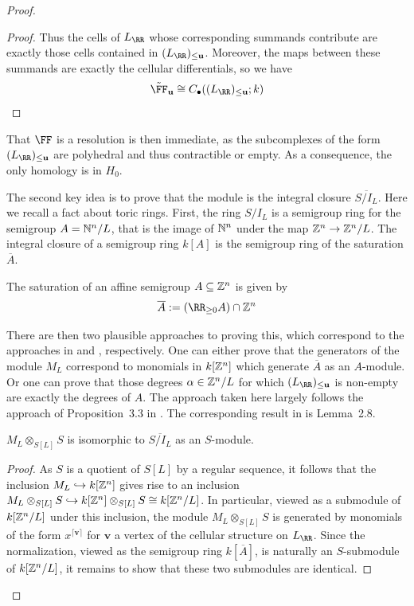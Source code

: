 \documentclass{amsart}
\begin{document}
\begin{proof}
\begin{proof}
  Thus the cells of $L_{\RR}$ whose corresponding summands contribute are exactly those cells contained in $(L_{\RR})_{\leq \mathbf{u}}$. Moreover, the maps between these summands are exactly the cellular differentials, so we have
  \[\tilde \FF_{\mathbf{u}} \cong C_\bullet((L_{\RR})_{\leq \mathbf{u}};k)\]
\end{proof}

That $\FF$ is a resolution is then immediate, as the subcomplexes of the form $(L_{\RR})_{\leq \mathbf{u}}$ are polyhedral and thus contractible or empty. As a consequence, the only homology is in $H_0$.

The second key idea is to prove that the module is the integral closure $\overline{S/I_L}$. Here we recall a fact about toric rings. First, the ring $S/I_L$ is a semigroup ring for the semigroup $A=\mathbb N^n/L$, that is the image of $\mathbb N^n$ under the map $\mathbb Z^n \rightarrow \mathbb Z^n/L$. The integral closure of a semigroup ring $k[A]$ is the semigroup ring of the saturation $\overline{A}$.

The saturation of an affine semigroup $A\subseteq \mathbb Z^n$ is given by
\[\overline{A} := (\RR_{\geq 0}A)\cap \ZZ^n \]

There are then two plausible approaches to proving this, which correspond to the approaches in \cite{BCHSY} and \cite{BH25}, respectively. One can either prove that the generators of the module $M_L$ correspond to monomials in $k[\mathbb Z^n]$ which generate $\overline{A}$ as an $A$-module. Or one can prove that those degrees $\alpha\in \mathbb Z^n/L$ for which $(L_{\RR})_{\leq \mathbf{u}}$ is non-empty are exactly the degrees of $A$. The approach taken here largely follows the approach of Proposition~3.3 in \cite{BCHSY}. The corresponding result in \cite{BH25} is Lemma~2.8.

\begin{prop}
  \label{prop:resolves-integral-closure}
  $M_L \otimes_{S[L]} S$ is isomorphic to $\overline{S/I_L}$ as an $S$-module.
\end{prop}
\begin{proof}
  As $S$ is a quotient of $S[L]$ by a regular sequence, it follows that the inclusion $M_L\hookrightarrow k[\mathbb Z^n]$ gives rise to an inclusion $M_L\otimes_{S[L]} S \hookrightarrow k[\mathbb Z^n]\otimes_{S[L]} S \cong k[\mathbb Z^n/L]$. In particular, viewed as a submodule of $k[\mathbb Z^n/L]$ under this inclusion, the module $M_L\otimes_{S[L]} S$ is generated by monomials of the form $x^{\lceil \mathbf{v}\rceil}$ for $\mathbf{v}$ a vertex of the cellular structure on $L_{\RR}$. Since the normalization, viewed as the semigroup ring $k[\overline{A}]$, is naturally an $S$-submodule of $k[\mathbb Z^n/L]$, it remains to show that these two submodules are identical.


\end{proof}
\end{proof}
\end{document}
